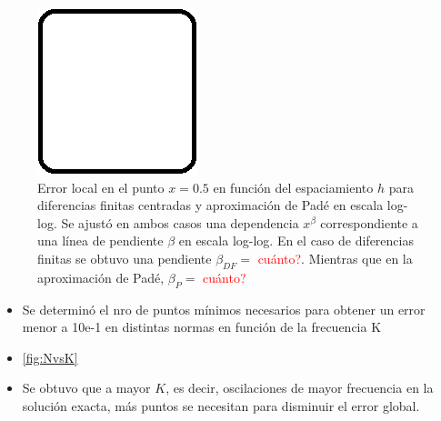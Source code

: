 \documentclass[aps,prb,twocolumn,superscriptaddress,floatfix,longbibliography]{revtex4-2}
\newif\ifptitle
\newif\ifpnumber
\newcounter{para}
\newcommand\ptitle[1]{\par\refstepcounter{para}
{\ifpnumber{\noindent\textcolor{lightgray}{\textbf{\thepara}}\indent}\fi}
{\ifptitle{\textbf{[{#1}]}}\fi}}
\begin{document}
\begin{figure}[h]
    \includegraphics[clip=true,width=\columnwidth]{Figures/nada.png}
    \caption{Error local en el punto $x = 0.5$ en función del espaciamiento $h$ para diferencias finitas centradas y aproximación de Padé en escala log-log. Se ajustó en ambos casos una dependencia $x^\beta$ correspondiente a una línea de pendiente $\beta$ en escala log-log. En el caso de diferencias finitas se obtuvo una pendiente $\beta_{DF} = $ \textcolor{red}{cuánto?}. Mientras que en la aproximación de Padé, $\beta_P = $ \textcolor{red}{cuánto?} }
     \label{fig:error_local_0.5}
\end{figure}

\ptitle{Se determinó el nro de puntos mínimos necesarios para obtener un error menor a $10e-1$ en distintas normas en función de la frecuencia K}

\begin{itemize}
    \item Se determinó el nro de puntos mínimos necesarios para obtener un error menor a 10e-1 en distintas normas en función de la frecuencia K
    \item \ref{fig:NvsK}
    \item Se obtuvo que a mayor $K$, es decir, oscilaciones de mayor frecuencia en la solución exacta, más puntos se necesitan para disminuir el error global.
\end{itemize}
\end{document}
